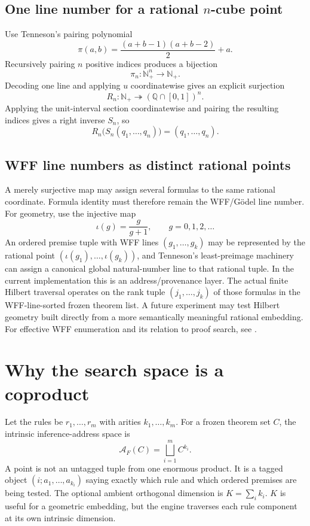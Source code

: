 \documentclass[11pt]{article}
\theoremstyle{hilberttheorem}
\begin{document}
\subsection{One line number for a rational \texorpdfstring{$n$}{n}-cube point}\label{subsec:ncube}
Use Tenneson's pairing polynomial
\[
\pi(a,b)=\frac{(a+b-1)(a+b-2)}{2}+a.
\]
Recursively pairing $n$ positive indices produces a bijection
\[
\pi_n:\mathbb N_+^n\longrightarrow\mathbb N_+.
\]
Decoding one line and applying $u$ coordinatewise gives an explicit surjection
\[
R_n:\mathbb N_+\twoheadrightarrow(\mathbb Q\cap[0,1])^n.
\]
Applying the unit-interval section coordinatewise and pairing the resulting indices gives a right inverse $S_n$, so
\[
R_n\bigl(S_n(q_1,\ldots,q_n)\bigr)=(q_1,\ldots,q_n).
\]

\subsection{WFF line numbers as distinct rational points}\label{subsec:wff-lines}
A merely surjective map may assign several formulas to the same rational coordinate. Formula identity must therefore remain the WFF/G\"odel line number. For geometry, use the injective map
\[
\iota(g)=\frac{g}{g+1},\qquad g=0,1,2,\ldots
\]
An ordered premise tuple with WFF lines $(g_1,\ldots,g_k)$ may be represented by the rational point $(\iota(g_1),\ldots,\iota(g_k))$, and Tenneson's least-preimage machinery can assign a canonical global natural-number line to that rational tuple. In the current implementation this is an address/provenance layer. The actual finite Hilbert traversal operates on the rank tuple $(j_1,\ldots,j_k)$ of those formulas in the WFF-line-sorted frozen theorem list. A future experiment may test Hilbert geometry built directly from a more semantically meaningful rational embedding. For effective WFF enumeration and its relation to proof search, see \cite{proofhorizon}.

\section{Why the search space is a coproduct}\label{sec:coproduct}
Let the rules be $r_1,\ldots,r_m$ with arities $k_1,\ldots,k_m$. For a frozen theorem set $C$, the intrinsic inference-address space is
\[
\mathcal A_F(C)=\bigsqcup_{i=1}^{m} C^{k_i}.
\]
A point is not an untagged tuple from one enormous product. It is a tagged object $(i;a_1,\ldots,a_{k_i})$ saying exactly which rule and which ordered premises are being tested. The optional ambient orthogonal dimension is $K=\sum_i k_i$. $K$ is useful for a geometric embedding, but the engine traverses each rule component at its own intrinsic dimension.
\end{document}
